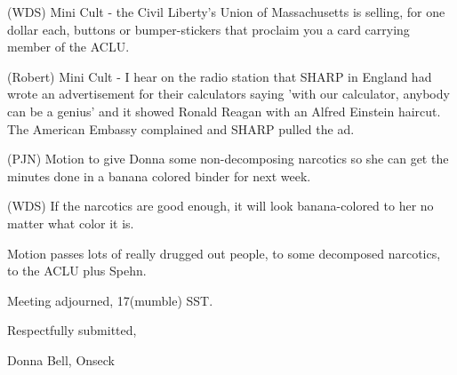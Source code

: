 \documentclass[12pt]{article}
\begin{document}
(WDS) Mini Cult - the Civil Liberty's Union of Massachusetts is selling, for one dollar each, buttons or bumper-stickers that proclaim you a card carrying member of the ACLU.

(Robert) Mini Cult - I hear on the radio station that SHARP in England had wrote an advertisement for their calculators saying 'with our calculator, anybody can be a genius' and it showed Ronald Reagan with an Alfred Einstein haircut. The American Embassy complained and SHARP pulled the ad.

(PJN) Motion to give Donna some non-decomposing narcotics so she can get the minutes done in a banana colored binder for next week.

(WDS) If the narcotics are good enough, it will look banana-colored to her no matter what color it is.

Motion passes lots of really drugged out people, to some decomposed narcotics, to the ACLU plus Spehn.

\vspace{12pt}

\noindent
Meeting adjourned, 17(mumble) SST.

\vspace{18pt}

\centerline{Respectfully submitted,}
\centerline{Donna Bell, Onseck}
\end{document}
